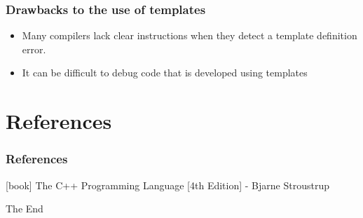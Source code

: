 \documentclass{beamer}
\begin{document}
\begin{frame}
\frametitle{Drawbacks to the use of templates}
\begin{itemize}
\item Many compilers lack clear instructions when they detect a template definition error.
\item It can be difficult to debug code that is developed using templates
\end{itemize}

\end{frame}


\section{References}
\begin{frame}
\frametitle{References}
\begin{thebibliography}{2} %
[book]
 The C++ Programming Language [4th Edition] - Bjarne Stroustrup
\end{thebibliography}
\end{frame}


\begin{frame}
\Huge{\centerline{The End}}
\end{frame}





\end{document}
